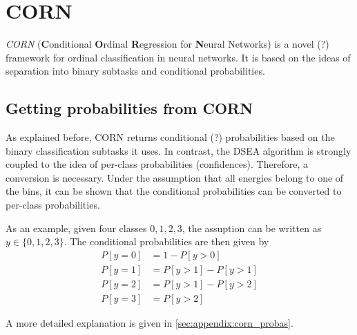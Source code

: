 \section{CORN}
\emph{CORN} (\textbf{C}onditional \textbf{O}rdinal \textbf{R}egression for \textbf{N}eural Networks) \cite{corn}
is a novel (?) framework for ordinal classification in neural networks.
It is based on the ideas of separation into binary subtasks and conditional probabilities.


\subsection{Getting probabilities from CORN} %
As explained before,
CORN returns conditional (?) probabilities based on the binary classification subtasks it uses.
In contrast,
the DSEA algorithm is strongly coupled to the idea of per-class probabilities (confidences).
Therefore, a conversion is necessary.
Under the assumption that all energies belong to one of the bins,
it can be shown that the conditional probabilities can be converted to per-class probabilities.

As an example, given four classes $0, 1, 2, 3$,
the assuption can be written as $y \in \{0, 1, 2, 3\}$.
The conditional probabilities are then given by
\begin{align*}
  P[y=0] &= 1 - P[y>0] \\
  P[y=1] &= P[y>1] - P[y>1] \\
  P[y=2] &= P[y>1] - P[y>2] \\
  P[y=3] &= P[y>2]
\end{align*}

A more detailed explanation is given in \autoref{sec:appendix:corn_probas}.
